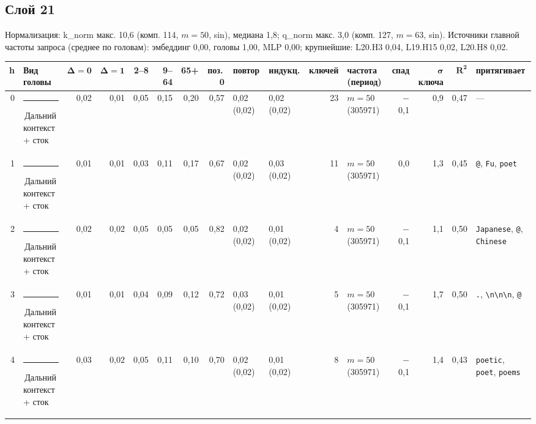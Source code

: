 \documentclass[10pt]{article}
\begin{document}
\noindent\begin{minipage}{\linewidth}
\subsection*{Слой 21}
{\small\color{ink2} Нормализация: k\_norm макс. 10,6 (комп. 114, $m{=}50$, sin), медиана 1,8; q\_norm макс. 3,0 (комп. 127, $m{=}63$, sin). Источники главной частоты запроса (среднее по головам): эмбеддинг 0,00, головы 1,00, MLP 0,00; крупнейшие: L20.H3 0,04, L19.H15 0,02, L20.H8 0,02.}
\begin{center}{\footnotesize\begin{tabular}{|r|l|r|r|r|r|r|r|l|l|r|l|r|r|r|l|}
\hline
\rowcolor{head}\textbf{h} & \textbf{Вид головы} & $\boldsymbol{\Delta{=}0}$ & $\boldsymbol{\Delta{=}1}$ & \textbf{2–8} & \textbf{9–64} & \textbf{65+} & \textbf{поз.\,0} & \textbf{повтор} & \textbf{индукц.} & \textbf{ключей} & \textbf{частота (период)} & \textbf{спад} & $\boldsymbol{\sigma}$ \textbf{ключа} & $\boldsymbol{R^2}$ & \textbf{притягивает} \\ \hline
0 & \textcolor[HTML]{C3C2B7}{\rule{0.62em}{0.62em}}\,Дальний контекст + сток & 0,02 & 0,01 & 0,05 & 0,15 & 0,20 & 0,57 & 0,02 (0,02) & 0,02 (0,02) & 23 & $m{=}50$ (305971) & $-$0,1 & 0,9 & 0,47 & — \\ \hline
1 & \textcolor[HTML]{C3C2B7}{\rule{0.62em}{0.62em}}\,Дальний контекст + сток & 0,01 & 0,01 & 0,03 & 0,11 & 0,17 & 0,67 & 0,02 (0,02) & 0,03 (0,02) & 11 & $m{=}50$ (305971) & 0,0 & 1,3 & 0,45 & \texttt{\textvisiblespace{}@}, \texttt{\textvisiblespace{}Fu}, \texttt{\textvisiblespace{}poet} \\ \hline
2 & \textcolor[HTML]{C3C2B7}{\rule{0.62em}{0.62em}}\,Дальний контекст + сток & 0,02 & 0,02 & 0,05 & 0,05 & 0,05 & 0,82 & 0,02 (0,02) & 0,01 (0,02) & 4 & $m{=}50$ (305971) & $-$0,1 & 1,1 & 0,50 & \texttt{\textvisiblespace{}Japanese}, \texttt{\textvisiblespace{}@}, \texttt{\textvisiblespace{}Chinese} \\ \hline
3 & \textcolor[HTML]{C3C2B7}{\rule{0.62em}{0.62em}}\,Дальний контекст + сток & 0,01 & 0,01 & 0,04 & 0,09 & 0,12 & 0,72 & 0,03 (0,02) & 0,01 (0,02) & 5 & $m{=}50$ (305971) & $-$0,1 & 1,7 & 0,50 & \texttt{\textvisiblespace{}.}, \texttt{\textvisiblespace{}\textbackslash{}n\textbackslash{}n\textbackslash{}n}, \texttt{\textvisiblespace{}@} \\ \hline
4 & \textcolor[HTML]{C3C2B7}{\rule{0.62em}{0.62em}}\,Дальний контекст + сток & 0,03 & 0,02 & 0,05 & 0,11 & 0,10 & 0,70 & 0,02 (0,02) & 0,01 (0,02) & 8 & $m{=}50$ (305971) & $-$0,1 & 1,4 & 0,43 & \texttt{\textvisiblespace{}poetic}, \texttt{\textvisiblespace{}poet}, \texttt{\textvisiblespace{}poems} \\ \hline

\end{tabular}}
\end{center}
\end{minipage}
\end{document}
